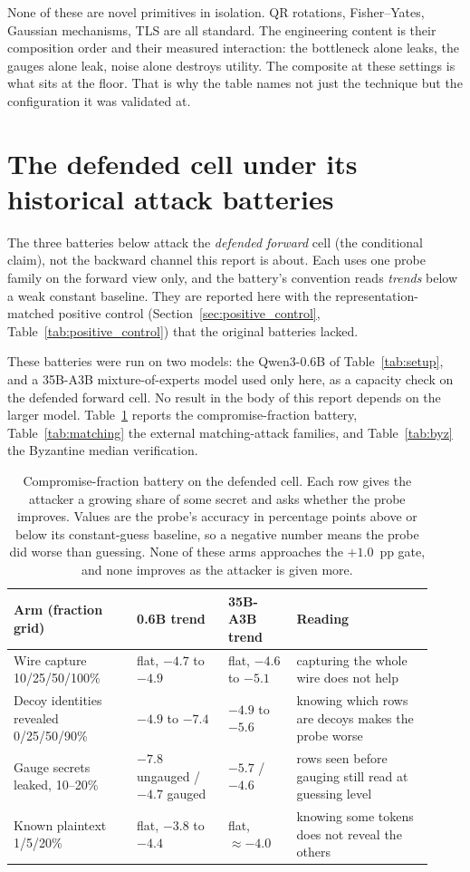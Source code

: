 \documentclass[11pt]{article}
\newcommand{\pp}{pp}
\begin{document}
None of these are novel primitives in isolation. QR rotations, Fisher--Yates,
Gaussian mechanisms, TLS are all standard. The engineering content is their
composition order and their measured interaction: the bottleneck alone leaks,
the gauges alone leak, noise alone destroys utility. The composite at these
settings is what sits at the floor. That is why the table names not just the
technique but the configuration it was validated at.

\section{The defended cell under its historical attack batteries}
\label{app:batteries}

The three batteries below attack the \emph{defended forward} cell (the
conditional claim), not the backward channel this report is about. Each uses
one probe family on the forward view only, and the battery's convention reads
\emph{trends} below a weak constant baseline. They are reported here with the
representation-matched positive control
(Section~\ref{sec:positive_control}, Table~\ref{tab:positive_control}) that the
original batteries lacked.

These batteries were run on two models: the Qwen3-0.6B of
Table~\ref{tab:setup}, and a 35B-A3B mixture-of-experts model used only here,
as a capacity check on the defended forward cell. No result in the body of this
report depends on the larger model. Table~\ref{tab:battery} reports the
compromise-fraction battery, Table~\ref{tab:matching} the external
matching-attack families, and Table~\ref{tab:byz} the Byzantine median
verification.

\begin{table}[H]
\centering\scriptsize


\begin{tabular}{@{}p{0.27\linewidth}p{0.20\linewidth}p{0.15\linewidth}p{0.30\linewidth}@{}}
\toprule
Arm (fraction grid) & 0.6B trend & 35B-A3B trend & Reading \\
\midrule
Wire capture 10/25/50/100\% & flat, $-4.7$ to $-4.9$ & flat, $-4.6$ to $-5.1$ & capturing the whole wire does not help \\
Decoy identities revealed 0/25/50/90\% & $-4.9$ to $-7.4$ & $-4.9$ to $-5.6$ & knowing which rows are decoys makes the probe worse \\
Gauge secrets leaked, 10--20\% & $-7.8$ ungauged / $-4.7$ gauged & $-5.7$ / $-4.6$ & rows seen before gauging still read at guessing level \\
Known plaintext 1/5/20\% & flat, $-3.8$ to $-4.4$ & flat, $\approx-4.0$ & knowing some tokens does not reveal the others \\
\bottomrule
\end{tabular}
\caption{Compromise-fraction battery on the defended cell. Each row gives the
attacker a growing share of some secret and asks whether the probe improves.
Values are the probe's accuracy in percentage points above or below its
constant-guess baseline, so a negative number means the probe did worse than
guessing. None of these arms approaches the $+1.0$~\pp{} gate, and none
improves as the attacker is given more.}
\label{tab:battery}
\end{table}
\end{document}
